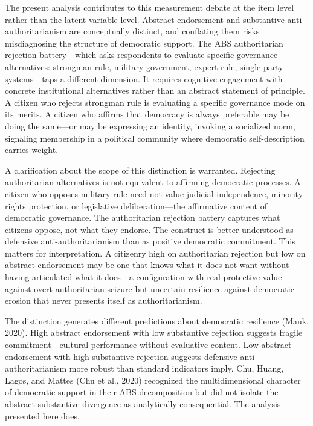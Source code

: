 \documentclass[
  12pt,
  12pt,
  letterpaper]{article}
\begin{document}
The present analysis contributes to this measurement debate at the item
level rather than the latent-variable level. Abstract endorsement and
substantive anti-authoritarianism are conceptually distinct, and
conflating them risks misdiagnosing the structure of democratic support.
The ABS authoritarian rejection battery---which asks respondents to
evaluate specific governance alternatives: strongman rule, military
government, expert rule, single-party systems---taps a different
dimension. It requires cognitive engagement with concrete institutional
alternatives rather than an abstract statement of principle. A citizen
who rejects strongman rule is evaluating a specific governance mode on
its merits. A citizen who affirms that democracy is always preferable
may be doing the same---or may be expressing an identity, invoking a
socialized norm, signaling membership in a political community where
democratic self-description carries weight.

A clarification about the scope of this distinction is warranted.
Rejecting authoritarian alternatives is not equivalent to affirming
democratic processes. A citizen who opposes military rule need not value
judicial independence, minority rights protection, or legislative
deliberation---the affirmative content of democratic governance. The
authoritarian rejection battery captures what citizens oppose, not what
they endorse. The construct is better understood as defensive
anti-authoritarianism than as positive democratic commitment. This
matters for interpretation. A citizenry high on authoritarian rejection
but low on abstract endorsement may be one that knows what it does not
want without having articulated what it does---a configuration with real
protective value against overt authoritarian seizure but uncertain
resilience against democratic erosion that never presents itself as
authoritarianism.

The distinction generates different predictions about democratic
resilience (Mauk, 2020). High abstract endorsement with low substantive
rejection suggests fragile commitment---cultural performance without
evaluative content. Low abstract endorsement with high substantive
rejection suggests defensive anti-authoritarianism more robust than
standard indicators imply. Chu, Huang, Lagos, and Mattes (Chu et al.,
2020) recognized the multidimensional character of democratic support in
their ABS decomposition but did not isolate the abstract-substantive
divergence as analytically consequential. The analysis presented here
does.
\end{document}
